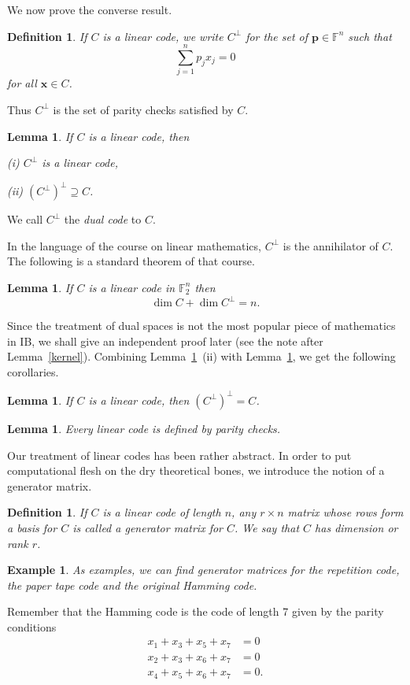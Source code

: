 \documentclass[12pt,a4paper]{article}
\theoremstyle{plain}
\newtheorem{lemma}[theorem]{Lemma}
\newtheorem{definition}[theorem]{Definition}
\newtheorem{example}[theorem]{Example}
\theoremstyle{definition}
\begin{document}
    We now prove the converse result.
    \begin{definition}
        If  $C$ is a linear code, we write
        $C^{\perp}$ for the set of  ${\mathbf p}\in{\mathbb F}^{n}$
        such that
        \[\sum_{j=1}^{n}p_{j}x_{j}=0\]
        for all ${\mathbf x}\in C$.
    \end{definition}
    \noindent
    Thus $C^{\perp}$ is the set of parity
    checks satisfied by $C$.
    \begin{lemma}
        \label{anhilate}
        If $C$ is a linear code, then

        (i) $C^{\perp}$ is a linear code,

        (ii) $(C^{\perp})^{\perp}\supseteq C$.
    \end{lemma}
    \noindent
    We call $C^{\perp}$ the \emph{dual code} to $C$.

    In the language of
    the course on linear mathematics,
    $C^{\perp}$ is the annihilator of $C$.
    The following is a standard theorem of
    that course.
    \begin{lemma}
        \label{dimension anhilator}
        If  $C$ is a linear code in
        ${\mathbb F}_{2}^{n}$ then
        \[\dim C+\dim C^{\perp}=n.\]
    \end{lemma}
    Since the treatment of dual spaces is not the most
    popular piece of mathematics in IB, we
    shall give an independent proof later
    (see the note after Lemma~\ref{kernel}).
    Combining Lemma~\ref{anhilate}~(ii)
    with Lemma~\ref{dimension anhilator},
    we get the following corollaries.
    \begin{lemma}
        If $C$ is a linear code, then
        $(C^{\perp})^{\perp}=C$.
    \end{lemma}
    \begin{lemma}
        \label{parity}
        Every linear code is defined by parity
        checks.
    \end{lemma}

    Our treatment of linear codes has
    been rather abstract. In order
    to put computational flesh on
    the dry theoretical bones,
    we introduce the notion of
    a generator matrix.
    \begin{definition}
        If $C$ is a linear
        code of length $n$, any  $r\times n$
        matrix whose rows form a basis
        for $C$ is called a \emph{generator matrix}
        for $C$. We say that $C$ has \emph{dimension}
        or \emph{rank} $r$.
    \end{definition}
    \begin{example}
        As examples, we can find
        generator matrices for the repetition code,
        the paper tape code and the original Hamming code.
    \end{example}
    Remember that the Hamming code is the
    code of length 7 given by the parity conditions
    \begin{align*}
        x_{1}+x_{3}+x_{5}+x_{7}&=0\\
        x_{2}+x_{3}+x_{6}+x_{7}&=0\\
        x_{4}+x_{5}+x_{6}+x_{7}&=0.
    \end{align*}
\end{document}

